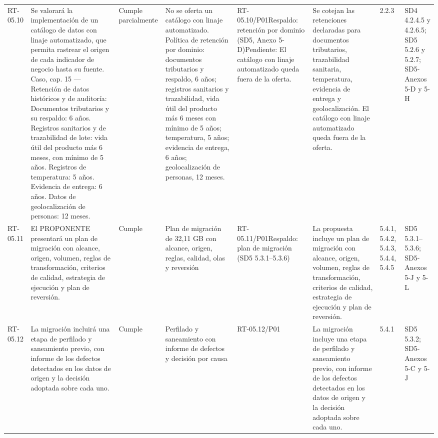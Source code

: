 \documentclass[oficio,firma,final]{lafrox}
\begin{document}
\begin{landscape}
{\begin{longtable}{@{}F{0.054} F{0.173} F{0.061} F{0.191} F{0.106} F{0.180} F{0.067} F{0.168}@{}}
  RT-05.10 & Se valorará la implementación de un catálogo de datos con linaje automatizado, que permita rastrear el origen de cada indicador de negocio hasta su fuente. Caso, cap. 15 — Retención de datos históricos y de auditoría: Documentos tributarios y su respaldo: 6 años. Registros sanitarios y de trazabilidad de lote: vida útil del producto más 6 meses, con mínimo de 5 años. Registros de temperatura: 5 años. Evidencia de entrega: 6 años. Datos de geolocalización de personas: 12 meses. & Cumple parcialmente & No se oferta un catálogo con linaje automatizado. Política de retención por dominio: documentos tributarios y respaldo, 6 años; registros sanitarios y trazabilidad, vida útil del producto más 6 meses con mínimo de 5 años; temperatura, 5 años; evidencia de entrega, 6 años; geolocalización de personas, 12 meses. & RT-05.10/\allowbreak{}P01\newline Respaldo: retención por dominio (SD5, Anexo 5-D)\newline Pendiente: El catálogo con linaje automatizado queda fuera de la oferta. & Se cotejan las retenciones declaradas para documentos tributarios, trazabilidad sanitaria, temperatura, evidencia de entrega y geolocalización. El catálogo con linaje automatizado queda fuera de la oferta. & 2.2.3 & SD4 4.2.4.5 y 4.2.6.5; SD5 5.2.6 y 5.2.7; SD5-Anexos 5-D y 5-H  \\
  RT-05.11 & El PROPONENTE presentará un plan de migración con alcance, origen, volumen, reglas de transformación, criterios de calidad, estrategia de ejecución y plan de reversión. & Cumple & Plan de migración de 32,11 GB con alcance, origen, reglas, calidad, olas y reversión & RT-05.11/\allowbreak{}P01\newline Respaldo: plan de migración (SD5 5.3.1--5.3.6) & La propuesta incluye un plan de migración con alcance, origen, volumen, reglas de transformación, criterios de calidad, estrategia de ejecución y plan de reversión. & 5.4.1, 5.4.2, 5.4.3, 5.4.4, 5.4.5 & SD5 5.3.1–5.3.6; SD5-Anexos 5-J y 5-L  \\
  RT-05.12 & La migración incluirá una etapa de perfilado y saneamiento previo, con informe de los defectos detectados en los datos de origen y la decisión adoptada sobre cada uno. & Cumple & Perfilado y saneamiento con informe de defectos y decisión por causa & RT-05.12/\allowbreak{}P01 & La migración incluye una etapa de perfilado y saneamiento previo, con informe de los defectos detectados en los datos de origen y la decisión adoptada sobre cada uno. & 5.4.1 & SD5 5.3.2; SD5-Anexos 5-C y 5-J  \\

\end{longtable}}
\end{landscape}
\end{document}
